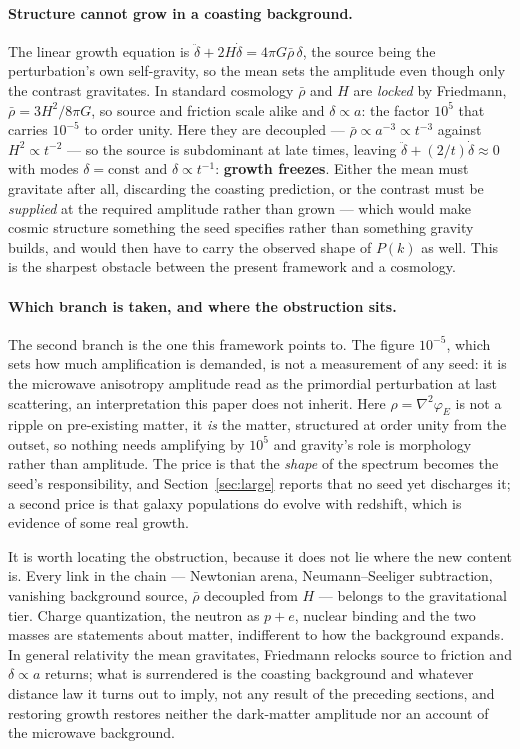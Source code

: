 \documentclass[11pt]{article}
\newcommand{\grad}{\nabla}
\begin{document}
\paragraph{Structure cannot grow in a coasting background.} The linear growth
equation is $\ddot\delta+2H\dot\delta=4\pi G\bar\rho\,\delta$, the source being the perturbation's own self-gravity,
so the mean sets the amplitude even though only the contrast gravitates. In standard cosmology $\bar\rho$ and $H$
are \emph{locked} by Friedmann, $\bar\rho=3H^2/8\pi G$, so source and friction scale alike and $\delta\propto a$:
the factor $10^5$ that carries $10^{-5}$ to order unity. Here they are decoupled --- $\bar\rho\propto a^{-3}\propto
t^{-3}$ against $H^2\propto t^{-2}$ --- so the source is subdominant at late times, leaving
$\ddot\delta+(2/t)\dot\delta\approx0$ with modes $\delta=\text{const}$ and $\delta\propto t^{-1}$: \textbf{growth
freezes}. Either the mean must gravitate after all, discarding the coasting prediction, or the contrast must be
\emph{supplied} at the required amplitude rather than grown --- which would make cosmic structure something the
seed specifies rather than something gravity builds, and would then have to carry the observed shape of $P(k)$ as
well. This is the sharpest obstacle between the present framework and a cosmology.

\paragraph{Which branch is taken, and where the obstruction sits.} The second branch is the one this framework
points to. The figure $10^{-5}$, which sets how much amplification is demanded, is not a measurement of any seed:
it is the microwave anisotropy amplitude read as the primordial perturbation at last scattering, an
interpretation this paper does not inherit. Here $\rho=\grad^2\varphi_E$ is not a ripple on pre-existing matter,
it \emph{is} the matter, structured at order unity from the outset, so nothing needs amplifying by $10^5$ and
gravity's role is morphology rather than amplitude. The price is that the \emph{shape} of the spectrum becomes
the seed's responsibility, and Section~\ref{sec:large} reports that no seed yet discharges it; a second price is
that galaxy populations do evolve with redshift, which is evidence of some real growth.

It is worth locating the obstruction, because it does not lie where the new content is. Every link in the chain
--- Newtonian arena, Neumann--Seeliger subtraction, vanishing background source, $\bar\rho$ decoupled from $H$
--- belongs to the gravitational tier. Charge quantization, the neutron as $p+e$, nuclear binding and the two
masses are statements about matter, indifferent to how the background expands. In general relativity the mean
gravitates, Friedmann relocks source to friction and $\delta\propto a$ returns; what is surrendered is the
coasting background and whatever distance law it turns out to imply, not any result of the preceding sections, and restoring growth restores
neither the dark-matter amplitude nor an account of the microwave background.
\end{document}
